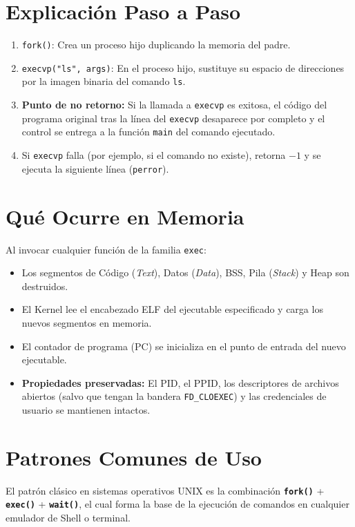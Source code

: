 \documentclass[12pt,a4paper]{article}
\begin{document}
\section{Explicación Paso a Paso}
\begin{enumerate}
    \item \texttt{fork()}: Crea un proceso hijo duplicando la memoria del padre.
    \item \texttt{execvp("ls", args)}: En el proceso hijo, sustituye su espacio de direcciones por la imagen binaria del comando \texttt{ls}.
    \item \textbf{Punto de no retorno:} Si la llamada a \texttt{execvp} es exitosa, el código del programa original tras la línea del \texttt{execvp} desaparece por completo y el control se entrega a la función \texttt{main} del comando ejecutado.
    \item Si \texttt{execvp} falla (por ejemplo, si el comando no existe), retorna $-1$ y se ejecuta la siguiente línea (\texttt{perror}).
\end{enumerate}

\section{Qué Ocurre en Memoria}
Al invocar cualquier función de la familia \texttt{exec}:
\begin{itemize}
    \item Los segmentos de Código (\textit{Text}), Datos (\textit{Data}), BSS, Pila (\textit{Stack}) y Heap son destruidos.
    \item El Kernel lee el encabezado ELF del ejecutable especificado y carga los nuevos segmentos en memoria.
    \item El contador de programa (PC) se inicializa en el punto de entrada del nuevo ejecutable.
    \item \textbf{Propiedades preservadas:} El PID, el PPID, los descriptores de archivos abiertos (salvo que tengan la bandera \texttt{FD\_CLOEXEC}) y las credenciales de usuario se mantienen intactos.
\end{itemize}

\section{Patrones Comunes de Uso}
El patrón clásico en sistemas operativos UNIX es la combinación \textbf{\texttt{fork()}} + \textbf{\texttt{exec()}} + \textbf{\texttt{wait()}}, el cual forma la base de la ejecución de comandos en cualquier emulador de Shell o terminal.
\end{document}
